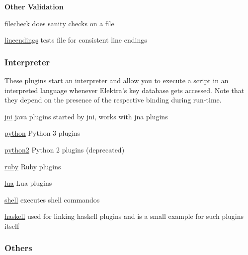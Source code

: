 {\bfseries Other Validation}


\begin{DoxyItemize}
\item \hyperlink{md_src_plugins_filecheck_README_src_plugins_filecheck_README_md}{filecheck} does sanity checks on a file
\item \hyperlink{md_src_plugins_lineendings_README_src_plugins_lineendings_README_md}{lineendings} tests file for consistent line endings
\end{DoxyItemize}

\subsubsection*{Interpreter}

These plugins start an interpreter and allow you to execute a script in an interpreted language whenever Elektra’s key database gets accessed. Note that they depend on the presence of the respective binding during run-\/time.


\begin{DoxyItemize}
\item \hyperlink{md_src_plugins_jni_README_src_plugins_jni_README_md}{jni} java plugins started by jni, works with jna plugins
\item \hyperlink{md_src_plugins_python_README_src_plugins_python_README_md}{python} Python 3 plugins
\item \hyperlink{md_src_plugins_python2_README_src_plugins_python2_README_md}{python2} Python 2 plugins (deprecated)
\item \hyperlink{md_src_plugins_ruby_README_src_plugins_ruby_README_md}{ruby} Ruby plugins
\item \hyperlink{md_src_plugins_lua_README_src_plugins_lua_README_md}{lua} Lua plugins
\item \hyperlink{md_src_plugins_shell_README_src_plugins_shell_README_md}{shell} executes shell commandos
\item \hyperlink{md_src_plugins_haskell_README_src_plugins_haskell_README_md}{haskell} used for linking haskell plugins and is a small example for such plugins itself
\end{DoxyItemize}

\subsubsection*{Others}


